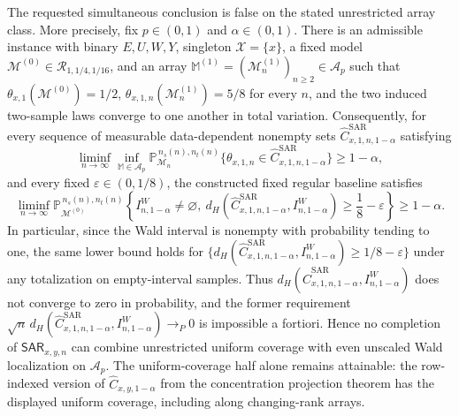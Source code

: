 The requested simultaneous conclusion is false on the stated unrestricted array class.  More precisely, fix \(p\in(0,1)\) and \(\alpha\in(0,1)\).  There is an admissible instance with binary \(E,U,W,Y\), singleton \(\mathcal X=\{x\}\), a fixed model \(\mathcal M^{(0)}\in\mathcal R_{1,1/4,1/16}\), and an array \(\mathbb M^{(1)}=(\mathcal M^{(1)}_n)_{n\ge2}\in\mathcal A_p\) such that \(\theta_{x,1}(\mathcal M^{(0)})=1/2\), \(\theta_{x,1,n}(\mathcal M^{(1)}_n)=5/8\) for every \(n\), and the two induced two-sample laws converge to one another in total variation.  Consequently, for every sequence of measurable data-dependent nonempty sets \(\widehat C^{\mathrm{SAR}}_{x,1,n,1-\alpha}\) satisfying
\[
\liminf_{n\to\infty}\inf_{\mathbb M\in\mathcal A_p}
\mathbb P_{\mathcal M_n}^{\,n_s(n),n_t(n)}
\{\theta_{x,1,n}\in\widehat C^{\mathrm{SAR}}_{x,1,n,1-\alpha}\}
\ge 1-\alpha,
\]
and every fixed \(\varepsilon\in(0,1/8)\), the constructed fixed regular baseline satisfies
\[
\liminf_{n\to\infty}
\mathbb P_{\mathcal M^{(0)}}^{\,n_s(n),n_t(n)}
\left\{I^W_{n,1-\alpha}\ne\varnothing,\ 
d_H\!\left(\widehat C^{\mathrm{SAR}}_{x,1,n,1-\alpha},I^W_{n,1-\alpha}\right)
\ge\frac18-\varepsilon\right\}
\ge1-\alpha.
\]
In particular, since the Wald interval is nonempty with probability tending to one, the same lower bound holds for \(\{d_H(\widehat C^{\mathrm{SAR}}_{x,1,n,1-\alpha},I^W_{n,1-\alpha})\ge1/8-\varepsilon\}\) under any totalization on empty-interval samples.  Thus \(d_H(\widehat C^{\mathrm{SAR}}_{x,1,n,1-\alpha},I^W_{n,1-\alpha})\) does not converge to zero in probability, and the former requirement \(\sqrt n\,d_H(\widehat C^{\mathrm{SAR}}_{x,1,n,1-\alpha},I^W_{n,1-\alpha})\longrightarrow_P0\) is impossible a fortiori.  Hence no completion of \(\mathsf{SAR}_{x,y,n}\) can combine unrestricted uniform coverage with even unscaled Wald localization on \(\mathcal A_p\).  The uniform-coverage half alone remains attainable: the row-indexed version of \(\widehat C_{x,y,1-\alpha}\) from the concentration projection theorem has the displayed uniform coverage, including along changing-rank arrays.